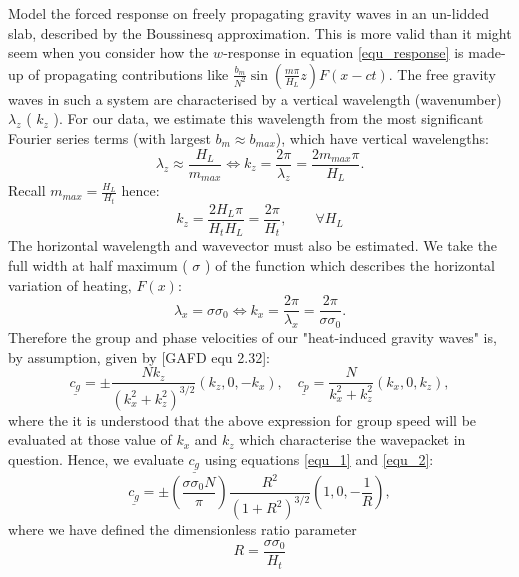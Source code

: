 \documentclass[12pt]{article}
\begin{document}
Model the forced response on freely propagating gravity waves in an un-lidded slab, described by the Boussinesq approximation.
This is more valid than it might seem when you consider how the $w$-response 
in equation \ref{equ_response} is made-up of propagating contributions like $\frac{b_m}{N^2} \sin \left( \frac{m \pi}{H_L} z \right) F(x - c t)$. 
The free gravity waves in such a system are characterised by a vertical wavelength (wavenumber) $\lambda_z$ ( $k_z$ ).
For our data, we estimate this wavelength from the most significant Fourier series terms (with largest $b_m \approx b_{max} $), which have vertical wavelengths:
%
\begin{equation}
\label{equ_1}
\lambda_z \approx \frac{H_L}{m_{max} } \iff k_z = \frac{2 \pi }{\lambda_z} = \frac{ 2 m_{max} \pi }{ H_L }.
\end{equation}
%
Recall $m_{max} = \frac{H_L}{H_t}$ hence:
%
\begin{equation}
k_z =  \frac{ 2H_L \pi }{ H_t H_L } = \frac{2 \pi }{ H_t}, \quad \quad \forall H_L
\end{equation}
%
The horizontal wavelength and wavevector must also be estimated. We take the full width at half maximum ( $\sigma$ ) of the function 
which describes the horizontal variation of heating, $F(x)$:
%
\begin{equation}
\label{equ_2}
\lambda_x = \sigma \sigma_0 \iff k_x = \frac{2 \pi}{ \lambda_x} = \frac{2 \pi }{\sigma \sigma_0}.
\end{equation}
%
Therefore the group and phase velocities of our "heat-induced gravity waves" is, by assumption, given by [GAFD equ 2.32]:
%
\begin{equation}
\underline{c_g} = \pm \frac{N k_z}{( k_x^2 + k_z^2)^{3/2}} ( k_z,0,-k_x), \quad \underline{c_p} =   \frac{N }{k_x^2 + k_z^2} ( k_x,0,k_z),
\end{equation}
%
where the it is understood that the above expression for group speed 
will be evaluated at those value of $k_x$ and $k_z$ which characterise the wavepacket in question.
Hence, we evaluate $\underline{c_g}$ using equations \ref{equ_1} and \ref{equ_2}:
%
\begin{equation}
\label{equ_cg}
\underline{c_g} = \pm \left( \frac{ \sigma \sigma_0 N }{\pi} \right)  \frac{ R^2 }{(1 + R^2 )^{3/2}} \left( 1,0,-\frac{1}{R }\right),
\end{equation}
%
where we have defined the dimensionless ratio parameter
%
\begin{equation}
R = \frac{\sigma \sigma_0}{ H_t} 
\end{equation}
%
\end{document}
